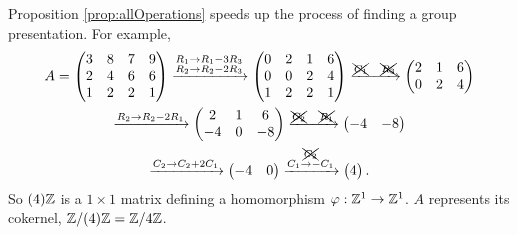 \documentclass[../algebraNotesMSRI-UP2016.tex]{subfiles}
\begin{document}
\begin{frame}{}{}
\begin{ex}
Proposition \ref{prop:allOperations} speeds up the process of finding a group presentation.  For example,
\begin{multline*}
A=\begin{pmatrix}
	3 & 8 & 7 & 9 \\
	2 & 4 & 6 & 6 \\
	1 & 2 & 2 & 1
\end{pmatrix}\xrightarrow{\substack{R_1\to R_1-3R_3 \\ R_2\to R_2-2R_3}}
	\begin{pmatrix}
	0 & 2 & 1 & 6 \\
	0 & 0 & 2 & 4 \\
	1 & 2 & 2 & 1
	\end{pmatrix}\xrightarrow{\xcancel{C_1}\quad \xcancel{R_3}}
		\begin{pmatrix}
		2 & 1 & 6 \\
		0 & 2 & 4
		\end{pmatrix} \\
\xrightarrow{R_2\to R_2-2R_1}
	\begin{pmatrix}
	2 & 1 & 6 \\
	-4 & 0 & -8
	\end{pmatrix}\xrightarrow{\xcancel{C_2}\quad \xcancel{R_1} }
		\begin{pmatrix}
		-4 & -8
		\end{pmatrix}  \\
\xrightarrow{C_2\to C_2+2C_1}
	\begin{pmatrix}
	-4 & 0 
	\end{pmatrix}\xrightarrow{\substack{\xcancel{C_2} \\ C_1\to -C_1}}
		\begin{pmatrix}
		4
		\end{pmatrix}.		
\end{multline*}
So $(4)\mathbb Z$ is a $1\times 1$ matrix defining a homomorphism $\varphi:\mathbb Z^1\to\mathbb Z^1$.  $A$ represents its cokernel, $\mathbb Z/(4)\mathbb Z=\mathbb Z/4\mathbb Z$. 
\end{ex}
\end{frame}

\end{document}
